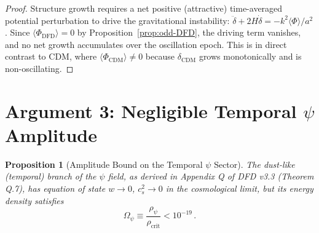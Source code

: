 \documentclass[12pt,a4paper]{article}
\newtheorem{proposition}[theorem]{Proposition}
\begin{document}
\begin{proof}
Structure growth requires a net positive (attractive) time-averaged
potential perturbation to drive the gravitational instability:
$\ddot{\delta} + 2H\dot{\delta} = -k^2\langle\Phi\rangle/a^2$.
Since $\langle\Phi_{\mathrm{DFD}}\rangle = 0$ by
Proposition~\ref{prop:odd-DFD}, the driving term vanishes, and no
net growth accumulates over the oscillation epoch. This is in
direct contrast to CDM, where $\langle\Phi_{\mathrm{CDM}}\rangle \neq 0$
because $\delta_{\mathrm{CDM}}$ grows monotonically and is
non-oscillating.
\end{proof}

\section{Argument 3: Negligible Temporal $\psi$ Amplitude}
\label{sec:arg3}

\begin{proposition}[Amplitude Bound on the Temporal $\psi$ Sector]
\label{prop:temporal-bound}
The dust-like (temporal) branch of the $\psi$ field, as derived in
Appendix Q of DFD v3.3 (Theorem Q.7), has equation of state
$w \to 0$, $c_s^2 \to 0$ in the cosmological limit, but its energy
density satisfies
\begin{equation}
\label{eq:Omega-bound}
\Omega_\psi \equiv \frac{\rho_\psi}{\rho_{\mathrm{crit}}} < 10^{-19}\,.
\end{equation}
\end{proposition}
\end{document}
